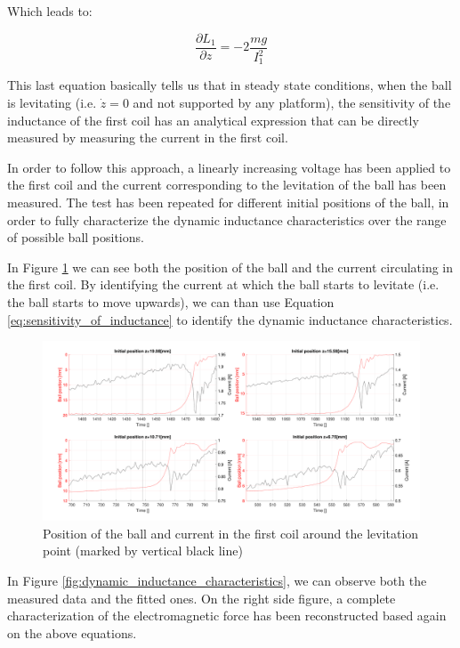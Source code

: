 Which leads to:

\begin{equation}
    \frac{\partial L_1}{\partial z} = -2 \frac{m g}{I_1^2}
    \label{eq:sensitivity_of_inductance}
\end{equation}

This last equation basically tells us that in steady state conditions, when the ball is levitating (i.e. $\dot{z} = 0$ and not supported by any platform), the sensitivity of the inductance of the first coil has an analytical expression that can be directly measured by measuring the current in the first coil.

In order to follow this approach, a linearly increasing voltage has been applied to the first coil and the current corresponding to the levitation of the ball has been measured.
The test has been repeated for different initial positions of the ball, in order to fully characterize the dynamic inductance characteristics over the range of possible ball positions.

In Figure \ref{fig:levitation_current} we can see both the position of the ball and the current circulating in the first coil.
By identifying the current at which the ball starts to levitate (i.e. the ball starts to move upwards), we can than use Equation \ref{eq:sensitivity_of_inductance} to identify the dynamic inductance characteristics.

\begin{figure}[H]
    \centering
    \includegraphics[width=1\textwidth]{img/MATLAB/identification/currents_for_force.pdf}
    \caption{Position of the ball and current in the first coil around the levitation point (marked by vertical black line)}
    \label{fig:levitation_current}
\end{figure}

In Figure \ref{fig:dynamic_inductance_characteristics}, we can observe both the measured data and the fitted ones.
On the right side figure, a complete characterization of the electromagnetic force has been reconstructed based again on the above equations.

